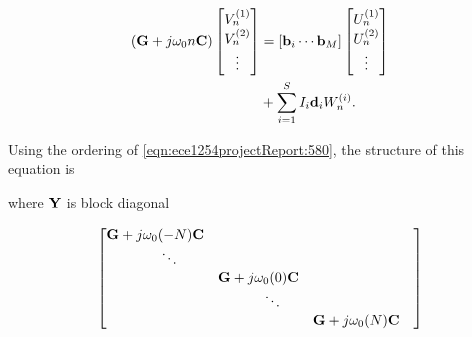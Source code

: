\documentclass[12pt,journal,compsoc]{../ieeepaper/IEEEtran}
\begin{document}
\begin{equation}\label{eqn:ece1254projectReport:540}
\begin{aligned}
\lr{
\BG + j \omega_0 n \BC
}
\begin{bmatrix}
V_n^{(1)} \\
V_n^{(2)} \\
\vdots \\
\end{bmatrix}
&= 
[\Bb_i \cdots \Bb_M]
\begin{bmatrix}
U_n^{(1)} \\
U_n^{(2)} \\
\vdots \\
\end{bmatrix} \\
&+ \sum_{i = 1}^S I_i \Bd_i
W_n^{(i)} 
.
\end{aligned}
\end{equation}

Using the ordering of \cref{eqn:ece1254projectReport:580}, the structure of this equation is


where \( \mathbf{Y} \) is block diagonal

\begin{equation}\label{eqn:ece1254projectReport:1360}
\small{
\begin{bmatrix}
\BG + j \omega_0 (-N) \BC &        &                                   & \\
                            \qquad\ddots &                                   & \\
                                   &  \BG + j \omega_0 (0) \BC         & \\
                                   &                            \qquad\ddots & \\
                                   &                                   & \BG + j \omega_0 (N) \BC  
\end{bmatrix}
}
\end{equation}
\end{document}
